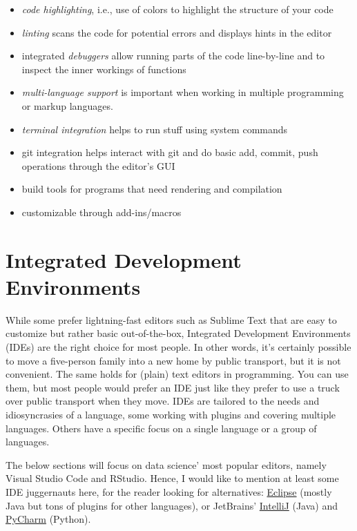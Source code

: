 \documentclass[
  12pt,
  letterpaper,
]{krantz}
\providecommand{\tightlist}{%
  \setlength{\itemsep}{0pt}\setlength{\parskip}{0pt}}\usepackage{longtable,booktabs,array}
\begin{document}
\begin{itemize}
\tightlist
\item
  \emph{code highlighting}, i.e., use of colors to highlight the
  structure of your code
\item
  \emph{linting} scans the code for potential errors and displays hints
  in the editor
\item
  integrated \emph{debuggers} allow running parts of the code
  line-by-line and to inspect the inner workings of functions
\item
  \emph{multi-language support} is important when working in multiple
  programming or markup languages.
\item
  \emph{terminal integration} helps to run stuff using system commands
\item
  git integration helps interact with git  and do
  basic add, commit, push operations through the editor's GUI
\item
  build tools for programs that need rendering and compilation
\item
  customizable through add-ins/macros
\end{itemize}

\hypertarget{integrated-development-environments}{%
\section{Integrated Development
Environments}\label{integrated-development-environments}}

While some prefer lightning-fast editors such as Sublime Text that are
easy to customize but rather basic out-of-the-box, Integrated
Development Environments (IDEs) are the right choice for most
people. In other words, it's certainly possible to move a five-person
family into a new home by public transport, but it is not convenient.
The same holds for (plain) text editors in programming. You can use
them, but most people would prefer an IDE just like they prefer to use a
truck over public transport when they move. IDEs are tailored to the
needs and idiosyncrasies of a language, some working with plugins and
covering multiple languages. Others have a specific focus on a single
language or a group of languages.

The below sections will focus on data science' most popular editors,
namely Visual Studio Code and RStudio. Hence, I would like to mention at
least some IDE juggernauts here, for the reader looking for
alternatives: \href{https://www.eclipse.org/}{Eclipse} (mostly Java but
tons of plugins for other languages), or JetBrains'
\href{https://www.jetbrains.com/idea/}{IntelliJ} (Java) and
\href{https://www.jetbrains.com/pycharm/}{PyCharm}
(Python).
\end{document}
